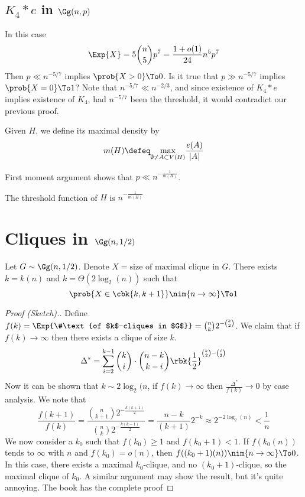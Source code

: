\documentclass[a4paper, 11pt, oneside]{book}
\begin{document}
\subsection{$K_4*e$ in $\Gg(n,p)$}
In this case
\[
\Exp{X} = 5{n\choose 5}p^7 = \frac{1+o(1)}{24} n^5p^7
\]
Then $p\ll n^{-5/7}$ implies $\prob{X > 0}\To 0$. Is it true that $p\gg n^{-5/7}$ implies $\prob{X = 0}\To 1$? Note that $n^{-5/7} \ll n^{-2/3}$, and since existence of $K_4*e$ implies existence of $K_4$, had $n^{-5/7}$ been the threshold, it would contradict our previous proof.
\begin{yellowBox}
\begin{defn}
	 Given $H$, we define its maximal density by
	\[
	m(H) \defeq \underset{\emptyset\neq A\subset V(H)}{\max} \frac{e(A)}{|A|}
	\]
\end{defn}	
\begin{remark}
	First moment argument shows that $p\ll n^{-\frac{1}{m(H)}}$.
\end{remark}
\end{yellowBox}
\begin{thm}
	\label{thm: Threshold characterization} The threshold function of $H$ is $n^{-\frac{1}{m(H)}}$
\end{thm}
\section{Cliques in $\Gg(n,1/2)$}
\begin{thm}
	Let $G\sim \Gg(n,1/2)$. Denote $X =\text{size of maximal clique in $G$}$.  There exists $k = k(n)$ and $k = \Theta(2\log_2(n))$ such that 
	\[
	\prob{X\in \cbk{k,k+1}} \nim{n\to \infty}\To 1
	\]
\end{thm}
\begin{proof}
	[Proof (Sketch).] Define 
	$f(k) = \Exp{\#\text{of $k$-cliques in $G$}} = {n\choose k}2^{-{k\choose 2}}$. We claim that if $f(k)\to \infty$ then there exists a clique of size $k$.
	\[
	\Delta^* =\sum_{i=2}^{k-1}{k\choose i}\cdot{n-k\choose k-i}\rbk{\frac{1}{2}}^{{k\choose 2}-{i\choose 2}}
	\]
	Now it can be shown that $k\sim 2\log_2(n$, if $f(k)\to \infty$ then $\frac{\Delta^*}{f(k)}\to 0$ by case analysis. We note that 
	\[
	\frac{f(k+1)}{f(k)} = \frac{{n\choose k+1}2^{-\frac{k(k+1)}{2}}}{{n\choose k}2^{-\frac{k(k-1)}{2}}} = \frac{n-k}{(k+1)}2^{-k}\approx 2^{-2\log_2(n)} < \frac{1}{n}
	\]
	We now consider a $k_0$ such that $f(k_0)\ge 1$ and $f(k_0+1) < 1$. If $f(k_0(n))$ tends to $\infty$ with $n$ and $f(k_0) = o(n)$, then $f((k_0+1)(n))\nim{n\to \infty}\To 0$. In this case, there exists a maximal $k_0$-clique, and no $(k_0+1)$-clique, so the maximal clique of $k_0$. A similar argument may show the result, but it's quite annoying. The book has the complete proof
\end{proof}
\end{document}
